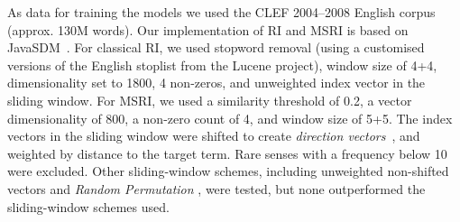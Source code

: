 

As data for training the models we used the CLEF 2004--2008 English corpus (approx. 130M words). 
Our implementation of RI and MSRI is based on JavaSDM~\citep{Hassel2004}.
For classical RI, we used stopword removal (using a customised versions of the English stoplist from the Lucene project), 
window size of 4+4, dimensionality set to 1800, 4 non-zeros, and unweighted index vector in the sliding window. For MSRI, we used a similarity threshold of 0.2, a vector dimensionality of 800, a non-zero count of 4, and window size of 5+5.
The index vectors in the sliding window were shifted to create \emph{direction vectors}~\citep{Sahlgren2008}, and weighted by distance to the target term. Rare senses with a frequency below 10 were excluded. 
Other sliding-window schemes, including unweighted non-shifted vectors and \emph{Random Permutation} \citep{Sahlgren2008}, were tested, but none outperformed the sliding-window schemes used.%


